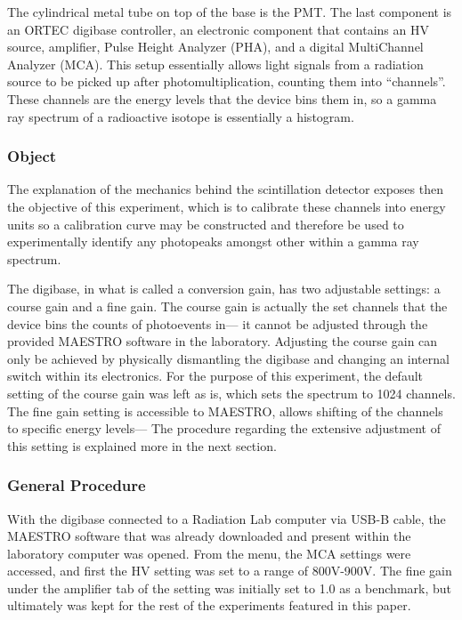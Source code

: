 \documentclass[12pt]{article}
\begin{document}
\begin{multicols}{2}
The cylindrical metal tube on top of the base  is the PMT. 
The last component is an ORTEC digibase controller, an electronic
component that contains an HV source, amplifier, Pulse Height Analyzer
(PHA), and a digital MultiChannel Analyzer (MCA). This setup
essentially allows light signals from a radiation source to be picked
up after photomultiplication, counting them into ``channels''.
These channels are the energy levels that the device bins them in,
so a gamma ray spectrum of a radioactive isotope is essentially a 
histogram.

\subsubsection{Object}
The explanation of the mechanics behind the 
scintillation detector exposes then the objective of 
this experiment, which is to calibrate these channels 
into energy units so a calibration curve may be 
constructed and therefore be used to experimentally 
identify any photopeaks amongst other within a gamma ray 
spectrum. 

The digibase, in what is called a conversion 
gain, has two adjustable settings: a course gain and a 
fine gain. The course gain is actually the set channels 
that the device bins the counts of photoevents in---
it cannot be adjusted through the provided MAESTRO software
in the laboratory. Adjusting the course gain can only be
achieved by physically dismantling the digibase and changing an 
internal switch within its electronics. For the purpose 
of this experiment, the default setting of the course 
gain was left as is, which sets the spectrum to 1024 
channels. The fine gain setting is accessible to MAESTRO,
allows shifting of the channels to specific energy levels---
The procedure regarding the extensive adjustment of this setting is 
explained more in the next section.

\subsubsection{General Procedure}
With the digibase connected to a Radiation 
Lab computer via USB-B cable, the MAESTRO software 
that was already downloaded and present within the 
laboratory computer was opened. 
From the menu, the MCA settings were accessed, and 
first the HV setting was set to a range of 800V-900V. 
The fine gain under the amplifier tab of the setting 
was initially set to 1.0 as a benchmark, but ultimately
was kept for the rest of the experiments featured in this paper.


\end{multicols}
\end{document}
